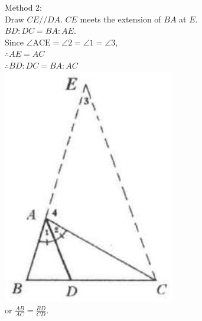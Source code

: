 \documentclass[10pt]{article}
\begin{document}
Method 2:\\
Draw \(C E / / D A\). \(C E\) meets the extension of \(B A\) at \(E\).\\
\(B D: D C=B A: A E\).\\
Since \(\angle \mathrm{ACE}=\angle 2=\angle 1=\angle 3\),\\
\(\therefore A E=A C\)\\
\(\therefore B D: D C=B A: A C\)\\
\includegraphics[max width=\textwidth, center]{2025_04_17_97bc1f7e44d93c271a88g-136(1)}\\
or \(\frac{A B}{A C}=\frac{B D}{C D}\).
\end{document}

